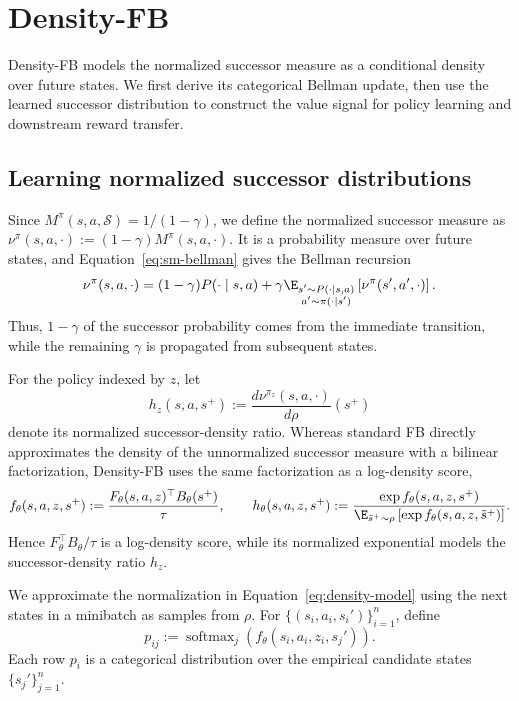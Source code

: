 \section{Density-FB}
\label{sec:method}

Density-FB models the normalized successor measure as a conditional density over future states. We first derive its categorical Bellman update, then use the learned successor distribution to construct the value signal for policy learning and downstream reward transfer.

\subsection{Learning normalized successor distributions}
\label{sec:method-density}

Since $M^\pi(s,a,\mathcal S)=1/(1-\gamma)$, we define the normalized successor measure as $\nu^\pi(s,a,\cdot):=(1-\gamma)M^\pi(s,a,\cdot)$. 
It is a probability measure over future states, and Equation~\eqref{eq:sm-bellman} gives the Bellman recursion
\begin{equation}
    \nu^\pi(s,a,\cdot) = (1-\gamma)P(\cdot\mid s,a) + \gamma\E_{\substack{s'\sim P(\cdot\mid s,a)\\a'\sim\pi(\cdot\mid s')}}\left[\nu^\pi(s',a',\cdot)\right].
    \label{eq:normalized-bellman}
\end{equation}
Thus, $1-\gamma$ of the successor probability comes from the immediate transition, while the remaining $\gamma$ is propagated from subsequent states.

For the policy indexed by $z$, let
\[
    h_z(s,a,s^+) := \frac{d\nu^{\pi_z}(s,a,\cdot)}{d\rho}(s^+)
\]
denote its normalized successor-density ratio. 
Whereas standard FB directly approximates the density of the unnormalized successor measure with a bilinear factorization, Density-FB uses the same factorization as a log-density score,
\begin{equation}
    f_\theta(s,a,z,s^+) := \frac{F_\theta(s,a,z)^\top B_\theta(s^+)}{\tau}, \qquad h_\theta(s,a,z,s^+) := \frac{\exp f_\theta(s,a,z,s^+)}{\E_{\tilde s^+\sim\rho}\left[\exp f_\theta(s,a,z,\tilde s^+)\right]}.
    \label{eq:density-model}
\end{equation}
Hence $F_\theta^\top B_\theta/\tau$ is a log-density score, while its normalized exponential models the successor-density ratio $h_z$.

We approximate the normalization in Equation~\eqref{eq:density-model} using the next states in a minibatch as samples from $\rho$. 
For $\{(s_i,a_i,s_i')\}_{i=1}^{n}$, define
\begin{equation}
    p_{ij} := \operatorname{softmax}_{j}\left(f_\theta(s_i,a_i,z_i,s_j')\right).
    \label{eq:density-softmax}
\end{equation}
Each row $p_i$ is a categorical distribution over the empirical candidate states $\{s_j'\}_{j=1}^{n}$.

